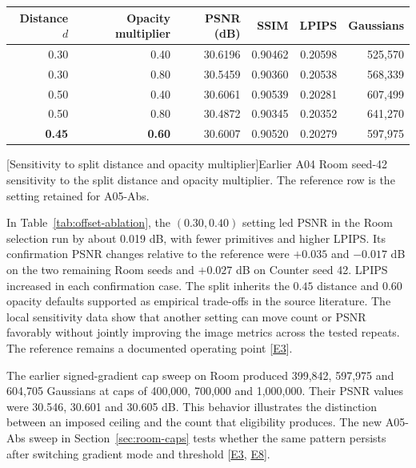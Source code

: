 \begin{center}\begin{minipage}{\linewidth}
\small\begin{tabular*}{\linewidth}{@{\extracolsep{\fill}}rrrrrr@{}}
\toprule
Distance $d$ & Opacity multiplier & PSNR (dB) & SSIM & LPIPS & Gaussians\\
\midrule
0.30 & 0.40 & 30.6196 & 0.90462 & 0.20598 & 525,570\\
0.30 & 0.80 & 30.5459 & 0.90360 & 0.20538 & 568,339\\
0.50 & 0.40 & 30.6061 & 0.90539 & 0.20281 & 607,499\\
0.50 & 0.80 & 30.4872 & 0.90345 & 0.20352 & 641,270\\
\textbf{0.45} & \textbf{0.60} & 30.6007 & 0.90520 & 0.20279 & 597,975\\
\bottomrule
\end{tabular*}\par
{}[Sensitivity to split distance and opacity multiplier]{Earlier A04 Room seed-42 sensitivity to the split distance and opacity multiplier. The reference row is the setting retained for A05-Abs.}\label{tab:offset-ablation}
\end{minipage}\end{center}

In Table~\ref{tab:offset-ablation}, the $(0.30,0.40)$ setting led PSNR in the Room selection run by about 0.019 dB, with fewer primitives and higher LPIPS. Its confirmation PSNR changes relative to the reference were $+0.035$ and $-0.017$ dB on the two remaining Room seeds and $+0.027$ dB on Counter seed 42. LPIPS increased in each confirmation case. The split inherits the $0.45$ distance and $0.60$ opacity defaults supported as empirical trade-offs in the source literature. The local sensitivity data show that another setting can move count or PSNR favorably without jointly improving the image metrics across the tested repeats. The reference remains a documented operating point [\hyperlink{evE3}{E3}].

The earlier signed-gradient cap sweep on Room produced 399,842, 597,975 and 604,705 Gaussians at caps of 400,000, 700,000 and 1,000,000. Their PSNR values were 30.546, 30.601 and 30.605 dB. This behavior illustrates the distinction between an imposed ceiling and the count that eligibility produces. The new A05-Abs sweep in Section~\ref{sec:room-caps} tests whether the same pattern persists after switching gradient mode and threshold [\hyperlink{evE3}{E3}, \hyperlink{evE8}{E8}].

